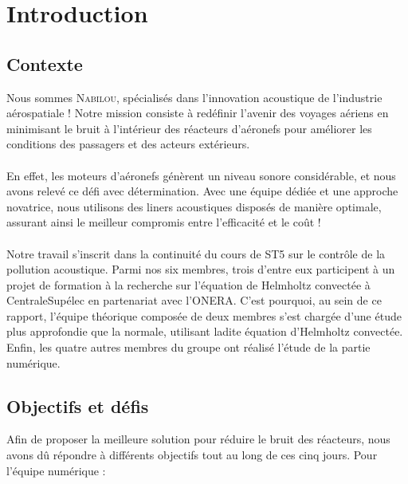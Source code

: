 \section{Introduction}

\subsection{Contexte}

Nous sommes \textsc{Nabilou}, spécialisés dans l'innovation acoustique de l'industrie aérospatiale ! Notre mission consiste à redéfinir l'avenir des voyages aériens en minimisant le bruit à l'intérieur des réacteurs d'aéronefs pour améliorer les conditions des passagers et des acteurs extérieurs.\\ \\
En effet, les moteurs d'aéronefs génèrent un niveau sonore considérable, et nous avons relevé ce défi avec détermination. Avec une équipe dédiée et une approche novatrice, nous utilisons des liners acoustiques disposés de manière optimale, assurant ainsi le meilleur compromis entre l'efficacité et le coût !\\ \\
Notre travail s'inscrit dans la continuité du cours de ST5 sur le contrôle de la pollution acoustique. Parmi nos six membres, trois d'entre eux participent à un projet de formation à la recherche sur l'équation de Helmholtz convectée à CentraleSupélec en partenariat avec l'ONERA. C'est pourquoi, au sein de ce rapport, l'équipe théorique composée de deux membres s'est chargée d'une étude plus approfondie que la normale, utilisant ladite équation d'Helmholtz convectée. Enfin, les quatre autres membres du groupe ont réalisé l'étude de la partie numérique.

\subsection{Objectifs et défis}

Afin de proposer la meilleure solution pour réduire le bruit des réacteurs, nous avons dû répondre à différents objectifs tout au long de ces cinq jours. Pour l'équipe numérique :

